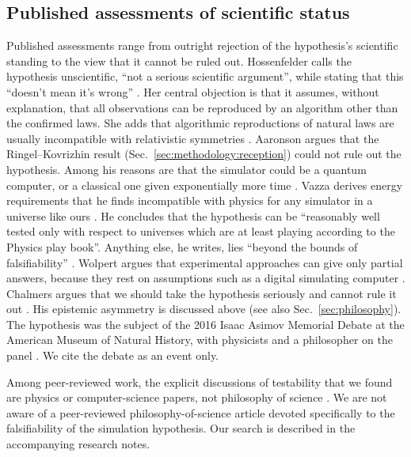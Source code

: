 \subsection{Published assessments of scientific status}
\label{sec:methodology:assessments}

Published assessments range from outright rejection of the hypothesis's
scientific standing to the view that it cannot be ruled out.
Hossenfelder calls the hypothesis unscientific, ``not a serious scientific
argument'', while stating that this ``doesn't mean it's wrong''
\cite{Hossenfelder2021simulation}. Her central objection is that it assumes,
without explanation, that all observations can be reproduced by an algorithm
other than the confirmed laws. She adds that algorithmic reproductions of
natural laws are usually incompatible with relativistic symmetries
\cite{Hossenfelder2021simulation}. Aaronson argues that the Ringel--Kovrizhin result
(Sec.~\ref{sec:methodology:reception}) could not rule out the hypothesis. Among
his reasons are that the simulator could be a quantum computer, or a classical
one given exponentially more time \cite{Aaronson2017because}. Vazza derives energy requirements that he
finds incompatible with physics for any simulator in a universe like ours
\cite{Vazza2025astrophysical}. He concludes that the hypothesis can be
``reasonably well tested only with respect to universes which are at least
playing according to the Physics play book''. Anything else, he writes, lies
``beyond the bounds of falsifiability'' \cite{Vazza2025astrophysical}. Wolpert
argues that experimental approaches can give only partial answers, because
they rest on assumptions such as a digital simulating computer
\cite{Wolpert2025what}. Chalmers argues that we should take the hypothesis
seriously and cannot rule it out \cite{Chalmers2024taking}. His epistemic
asymmetry is discussed above (see also Sec.~\ref{sec:philosophy}). The
hypothesis was the subject of the 2016 Isaac Asimov Memorial Debate at the
American Museum of Natural History, with physicists and a philosopher on the
panel \cite{AMNH2016is}. We cite the debate as an event only.

Among peer-reviewed work, the explicit discussions of testability that we
found are physics or computer-science papers, not philosophy of science
\cite{Beane2014constraints,Campbell2017on,Vazza2025astrophysical,Wolpert2025what}.
We are not aware of a peer-reviewed philosophy-of-science article devoted
specifically to the falsifiability of the simulation hypothesis. Our search is
described in the accompanying research notes.

